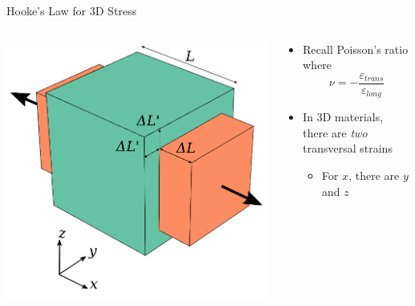 \documentclass[10pt, svgnames]{beamer}
\begin{document}
\begin{frame}[label={sec:orgb8ce6f2}]{Hooke's Law for 3D Stress}
\begin{columns}
\begin{column}{0.4\columnwidth}
\begin{center}
\includegraphics[width=\textwidth]{pictures/3d-poisson.png}
\end{center}
\end{column}

\begin{column}{0.6\columnwidth}
\begin{itemize}
\item Recall Poisson's ratio where
\[\nu = - \dfrac{\varepsilon_{trans}}{\varepsilon_{long}}\]

\item In 3D materials, there are \emph{two} transversal strains

\begin{itemize}
\item For \(x\), there are \(y\) and \(z\)
\end{itemize}
\end{itemize}
\end{column}
\end{columns}
\end{frame}
\end{document}
